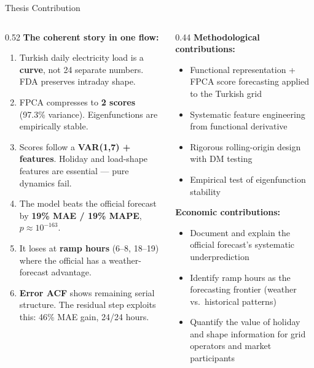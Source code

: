 \documentclass[10pt,aspectratio=169]{beamer}
\begin{document}
\begin{frame}{Thesis Contribution}

  \begin{columns}
  \begin{column}{0.52\textwidth}
    \textbf{The coherent story in one flow:}
    \vspace{0.3em}
    \begin{enumerate}
      \item Turkish daily electricity load is a \textbf{curve}, not 24
        separate numbers. FDA preserves intraday shape.
      \item FPCA compresses to \textbf{2 scores} (97.3\% variance).
        Eigenfunctions are empirically stable.
      \item Scores follow a \textbf{VAR(1,7) + features}. Holiday
        and load-shape features are essential --- pure dynamics fail.
      \item The model beats the official forecast by
        \textbf{19\% MAE / 19\% MAPE}, $p \approx 10^{-163}$.
      \item It loses at \textbf{ramp hours} (6--8, 18--19) where
        the official has a weather-forecast advantage.
      \item \textbf{Error ACF} shows remaining serial structure.
        The residual step exploits this: 46\% MAE gain, 24/24 hours.
    \end{enumerate}
  \end{column}
  \begin{column}{0.44\textwidth}
    \textbf{Methodological contributions:}
    \begin{itemize}
      \item Functional representation + FPCA score forecasting
        applied to the Turkish grid
      \item Systematic feature engineering from functional derivative
      \item Rigorous rolling-origin design with DM testing
      \item Empirical test of eigenfunction stability
    \end{itemize}
    \vspace{0.5em}
    \textbf{Economic contributions:}
    \begin{itemize}
      \item Document and explain the official forecast's systematic
        underprediction
      \item Identify ramp hours as the forecasting frontier
        (weather vs.\ historical patterns)
      \item Quantify the value of holiday and shape information
        for grid operators and market participants
    \end{itemize}
  \end{column}
  \end{columns}
\end{frame}
\end{document}
